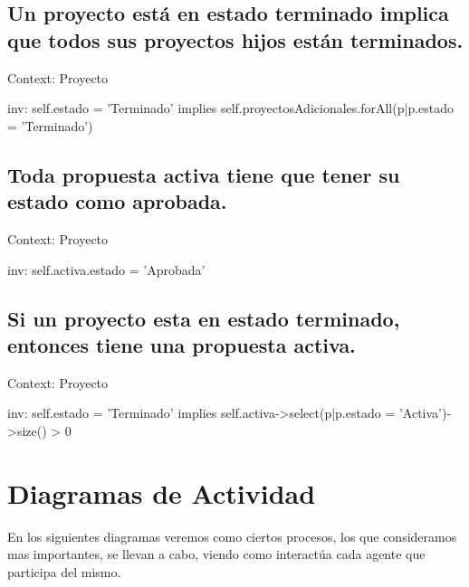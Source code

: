 \documentclass{article}
\theoremstyle{definition}
\theoremstyle{remark}
\begin{document}
\subsection*{Un proyecto está en estado terminado implica que todos sus proyectos hijos están terminados.}

\begin{ocl}{}
Context: Proyecto

inv:
self.estado = 'Terminado' implies self.proyectosAdicionales.forAll(p|p.estado = 'Terminado')

\end{ocl}

\subsection*{Toda propuesta activa tiene que tener su estado como aprobada.}

\begin{ocl}{}
Context: Proyecto

inv:
self.activa.estado = 'Aprobada'

\end{ocl}

\subsection*{Si un proyecto esta en estado terminado, entonces tiene una propuesta activa.}

\begin{ocl}{}
Context: Proyecto

inv:
self.estado = 'Terminado' implies self.activa->select(p|p.estado = 'Activa')->size() > 0

\end{ocl}

\pagebreak

\section{Diagramas de Actividad}

En los siguientes diagramas veremos como ciertos procesos, los que consideramos mas importantes, se llevan a cabo, viendo como interactúa cada agente que participa del mismo.
\end{document}
